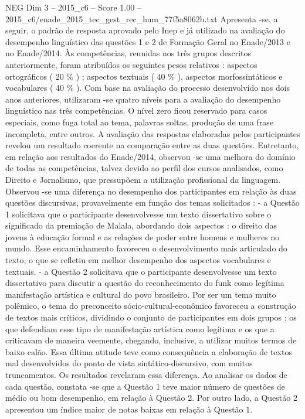 \begin{textsample}{NEG Dim 3 – 2015\_c6 – Score 1.00 – 2015\_c6/enade\_2015\_tec\_gest\_rec\_hum\_77f5a8062b.txt}
Apresenta -se, a seguir, o padrão de resposta aprovado pelo Inep e já utilizado na avaliação do desempenho linguístico das questões 1 e 2 de Formação Geral no Enade/2013 e no Enade/2014.
Às competências, reunidas nos três grupos descritos anteriormente, foram atribuídos os seguintes pesos relativos : aspectos ortográficos ( 20 \% ) ; aspectos textuais ( 40 \% ), aspectos morfossintáticos e vocabulares ( 40 \% ).
Com base na avaliação do processo desenvolvido nos dois anos anteriores, utilizaram -se quatro níveis para a avaliação do desempenho linguístico nas três competências.
O nível zero ficou reservado para casos especiais, como fuga total ao tema, palavras soltas, produção de uma frase incompleta, entre outros.
A avaliação das respostas elaboradas pelos participantes revelou um resultado coerente na comparação entre as duas questões.
Entretanto, em relação aos resultados do Enade/2014, observou -se uma melhora do domínio de todas as competências, talvez devido ao perfil dos cursos analisados, como Direito e Jornalismo, que pressupõem a utilização profissional da linguagem.
Observou -se uma diferença no desempenho dos participantes em relação às duas questões discursivas, provavelmente em função dos temas solicitados : - a Questão 1 solicitava que o participante desenvolvesse um texto dissertativo sobre o significado da premiação de Malala, abordando dois aspectos : o direito das jovens à educação formal e as relações de poder entre homens e mulheres no mundo.
Esse encaminhamento favoreceu o desenvolvimento mais articulado do texto, o que se refletiu em melhor desempenho dos aspectos vocabulares e textuais. - a Questão 2 solicitava que o participante desenvolvesse um texto dissertativo para discutir a questão do reconhecimento do funk como legítima manifestação artística e cultural do povo brasileiro.
Por ser um tema muito polêmico, o tema do preconceito sócio-cultural-econômico favoreceu a construção de textos mais críticos, dividindo o conjunto de participantes em dois grupos : os que defendiam esse tipo de manifestação artística como legítima e os que a criticavam de maneira veemente, chegando, inclusive, a utilizar muitos termos de baixo calão.
Essa última atitude teve como consequência a elaboração de textos mal desenvolvidos do ponto de vista sintático-discursivo, com muitos truncamentos.
Os resultados revelaram essa diferença.
Ao analisar os dados de cada questão, constata -se que a Questão 1 teve maior número de questões de médio ou bom desempenho, em relação à Questão 2.
Por outro lado, a Questão 2 apresentou um índice maior de notas baixas em relação à Questão 1.

\end{textsample}
